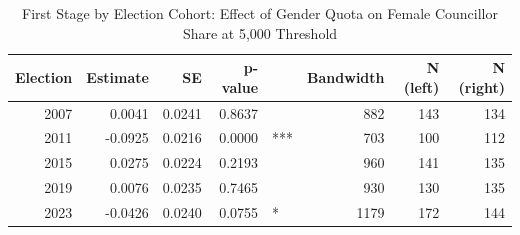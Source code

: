 \begin{table}[!h]
\centering
\caption{\label{tab:fs_evolution}First Stage by Election Cohort: Effect of Gender Quota on Female Councillor Share at 5,000 Threshold}
\centering
\begin{tabular}[t]{rrrrlrrr}
\toprule
Election & Estimate & SE & p-value &  & Bandwidth & N (left) & N (right)\\
\midrule
2007 & 0.0041 & 0.0241 & 0.8637 &  & 882 & 143 & 134\\
2011 & -0.0925 & 0.0216 & 0.0000 & *** & 703 & 100 & 112\\
2015 & 0.0275 & 0.0224 & 0.2193 &  & 960 & 141 & 135\\
2019 & 0.0076 & 0.0235 & 0.7465 &  & 930 & 130 & 135\\
2023 & -0.0426 & 0.0240 & 0.0755 & * & 1179 & 172 & 144\\
\bottomrule
\end{tabular}
\end{table}
